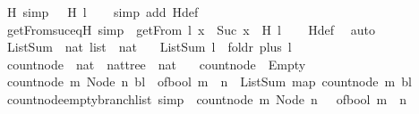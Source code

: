\begin{isabellebody}
\isanewline
{}\isamarkupfalse%
\ H{\isacharunderscore}{}\ {\isacharbrackleft}simp{\isacharbrackright}{\isacharcolon}\ {\isachardoublequoteopen}{}\ {\isasymin}\ H\ l{\isachardoublequoteclose}\isanewline
%
\isadelimproof
\ \ %
\endisadelimproof
%
\isatagproof
{}\isamarkupfalse%
\ {\isacharparenleft}simp\ add{\isacharcolon}\ H{\isacharunderscore}def{\isacharparenright}%
\endisatagproof
{\isafoldproof}%
%
\isadelimproof
\isanewline
%
\endisadelimproof
\ \ \isanewline
{}\isamarkupfalse%
\ getFrom{\isacharunderscore}suc{\isacharunderscore}eq{\isacharunderscore}H\ {\isacharbrackleft}simp{\isacharbrackright}{\isacharcolon}\ {\isachardoublequoteopen}{\isasymnot}\ getFrom{\isacharprime}\ l\ x\ {\isasymlongleftrightarrow}\ Suc\ x\ {\isasymin}\ H\ l{\isachardoublequoteclose}\isanewline
%
\isadelimproof
\ \ %
\endisadelimproof
%
\isatagproof
{}\isamarkupfalse%
\ H{\isacharunderscore}def\ \isamarkupfalse%
\ auto%
\endisatagproof
{\isafoldproof}%
%
\isadelimproof
\ \isanewline
%
\endisadelimproof
\isanewline
{}\isamarkupfalse%
\ ListSum\ {\isacharcolon}{\isacharcolon}\ {\isachardoublequoteopen}nat\ list\ {\isasymRightarrow}\ nat{\isachardoublequoteclose}\ \isanewline
\ \ {\isachardoublequoteopen}ListSum\ l\ {\isacharequal}\ foldr\ plus\ l\ {}{\isachardoublequoteclose}\isanewline
\ \ \isanewline
\isanewline
{}\isamarkupfalse%
\ count{\isacharunderscore}node\ {\isacharcolon}{\isacharcolon}\ {\isachardoublequoteopen}nat\ {\isasymRightarrow}\ nattree\ {\isasymRightarrow}\ nat{\isachardoublequoteclose}\ \isanewline
\ \ {\isachardoublequoteopen}count{\isacharunderscore}node\ {\isacharunderscore}\ Empty\ {\isacharequal}\ {}{\isachardoublequoteclose}\isanewline
{\isacharbar}\ {\isachardoublequoteopen}count{\isacharunderscore}node\ m\ {\isacharparenleft}Node\ n\ bl{\isacharparenright}\ {\isacharequal}\ {\isacharparenleft}of{\isacharunderscore}bool\ {\isacharparenleft}m\ {\isacharequal}\ n{\isacharparenright}{\isacharparenright}\ {\isacharplus}\ ListSum\ {\isacharparenleft}map\ {\isacharparenleft}count{\isacharunderscore}node\ m{\isacharparenright}\ bl{\isacharparenright}{\isachardoublequoteclose}\isanewline
\isanewline
{}\isamarkupfalse%
\ count{\isacharunderscore}node{\isacharunderscore}empty{\isacharunderscore}branch{\isacharunderscore}list\ {\isacharbrackleft}simp{\isacharbrackright}\ {\isacharcolon}\ {\isachardoublequoteopen}count{\isacharunderscore}node\ m\ {\isacharparenleft}Node\ n\ {\isacharbrackleft}{\isacharbrackright}{\isacharparenright}\ {\isacharequal}\ of{\isacharunderscore}bool\ {\isacharparenleft}m\ {\isacharequal}\ n{\isacharparenright}{\isachardoublequoteclose}%

\end{isabellebody}
